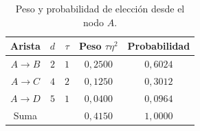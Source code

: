 \begin{table}[H]
\centering
\small
\setlength{\tabcolsep}{6pt}
\renewcommand{\arraystretch}{1.15}
\begin{tabular}{|c|c|c|c|c|}
\hline
\rowcolor{encabezado}\textbf{Arista} & \textbf{$d$} & \textbf{$\tau$} & \textbf{Peso $\tau\eta^2$} & \textbf{Probabilidad} \\
\hline
$A\to B$ & $2$ & $1$ & $0{,}2500$ & $0{,}6024$ \\
\hline
$A\to C$ & $4$ & $2$ & $0{,}1250$ & $0{,}3012$ \\
\hline
$A\to D$ & $5$ & $1$ & $0{,}0400$ & $0{,}0964$ \\
\hline
Suma &  &  & $0{,}4150$ & $1{,}0000$ \\
\hline
\end{tabular}
\caption{Peso y probabilidad de elección desde el nodo $A$.}
\label{tab:p4a-pesos}
\end{table}
